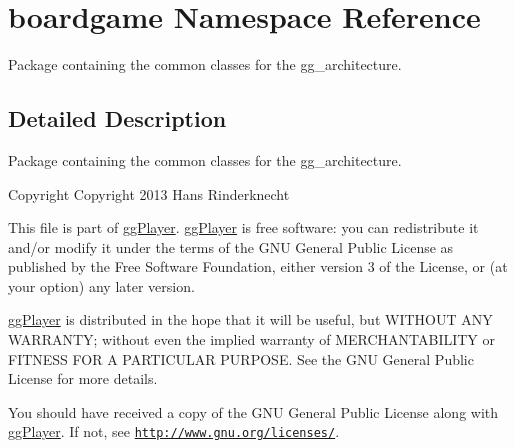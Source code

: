 \hypertarget{namespaceboardgame}{\section{boardgame Namespace Reference}
\label{namespaceboardgame}
}


Package containing the common classes for the gg\-\_\-architecture.  




\subsection{Detailed Description}
Package containing the common classes for the gg\-\_\-architecture. \begin{DoxyCopyright}{Copyright}
Copyright 2013 Hans Rinderknecht
\end{DoxyCopyright}
This file is part of \hyperlink{namespacegg_player}{gg\-Player}. \hyperlink{namespacegg_player}{gg\-Player} is free software\-: you can redistribute it and/or modify it under the terms of the G\-N\-U General Public License as published by the Free Software Foundation, either version 3 of the License, or (at your option) any later version.

\hyperlink{namespacegg_player}{gg\-Player} is distributed in the hope that it will be useful, but W\-I\-T\-H\-O\-U\-T A\-N\-Y W\-A\-R\-R\-A\-N\-T\-Y; without even the implied warranty of M\-E\-R\-C\-H\-A\-N\-T\-A\-B\-I\-L\-I\-T\-Y or F\-I\-T\-N\-E\-S\-S F\-O\-R A P\-A\-R\-T\-I\-C\-U\-L\-A\-R P\-U\-R\-P\-O\-S\-E. See the G\-N\-U General Public License for more details.

You should have received a copy of the G\-N\-U General Public License along with \hyperlink{namespacegg_player}{gg\-Player}. If not, see \href{http://www.gnu.org/licenses/}{\tt http\-://www.\-gnu.\-org/licenses/}. 
